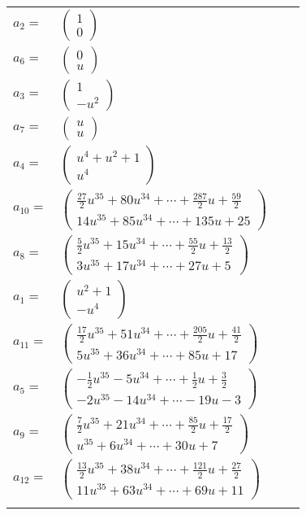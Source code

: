 \documentclass[1p]{elsarticle_modified}
\theoremstyle{definition}
\begin{document}
\begin{tabular}{m{7pt} m{180pt} m{7pt} m{180pt} }
\flushright $a_{2}=$&$\begin{pmatrix}1\\0\end{pmatrix}$ \\
\flushright $a_{6}=$&$\begin{pmatrix}0\\u\end{pmatrix}$ \\
\flushright $a_{3}=$&$\begin{pmatrix}1\\- u^2\end{pmatrix}$ \\
\flushright $a_{7}=$&$\begin{pmatrix}u\\u\end{pmatrix}$ \\
\flushright $a_{4}=$&$\begin{pmatrix}u^4+u^2+1\\u^4\end{pmatrix}$ \\
\flushright $a_{10}=$&$\begin{pmatrix}\frac{27}{2} u^{35}+80 u^{34}+\cdots+\frac{287}{2} u+\frac{59}{2}\\14 u^{35}+85 u^{34}+\cdots+135 u+25\end{pmatrix}$ \\
\flushright $a_{8}=$&$\begin{pmatrix}\frac{5}{2} u^{35}+15 u^{34}+\cdots+\frac{55}{2} u+\frac{13}{2}\\3 u^{35}+17 u^{34}+\cdots+27 u+5\end{pmatrix}$ \\
\flushright $a_{1}=$&$\begin{pmatrix}u^2+1\\- u^4\end{pmatrix}$ \\
\flushright $a_{11}=$&$\begin{pmatrix}\frac{17}{2} u^{35}+51 u^{34}+\cdots+\frac{205}{2} u+\frac{41}{2}\\5 u^{35}+36 u^{34}+\cdots+85 u+17\end{pmatrix}$ \\
\flushright $a_{5}=$&$\begin{pmatrix}-\frac{1}{2} u^{35}-5 u^{34}+\cdots+\frac{1}{2} u+\frac{3}{2}\\-2 u^{35}-14 u^{34}+\cdots-19 u-3\end{pmatrix}$ \\
\flushright $a_{9}=$&$\begin{pmatrix}\frac{7}{2} u^{35}+21 u^{34}+\cdots+\frac{85}{2} u+\frac{17}{2}\\u^{35}+6 u^{34}+\cdots+30 u+7\end{pmatrix}$ \\
\flushright $a_{12}=$&$\begin{pmatrix}\frac{13}{2} u^{35}+38 u^{34}+\cdots+\frac{121}{2} u+\frac{27}{2}\\11 u^{35}+63 u^{34}+\cdots+69 u+11\end{pmatrix}$\\&\end{tabular}
\end{document}
